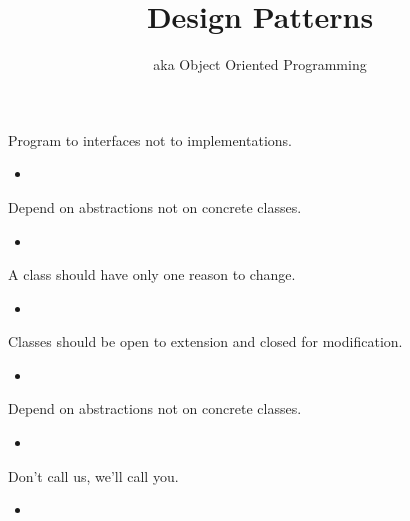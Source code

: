 \documentclass{beamer}
\title{Design Patterns}
\subtitle{aka Object Oriented Programming}
\begin{document}
\begin{frame}
  \titlepage
\end{frame}

\begin{frame}{Program to interfaces not to implementations.}
    \begin{itemize}
        \item
    \end{itemize}
\end{frame}

\begin{frame}{}
    
\end{frame}

\begin{frame}{Depend on abstractions not on concrete classes.}
    \begin{itemize}
        \item
    \end{itemize}
\end{frame}

\begin{frame}{}
    
\end{frame}

\begin{frame}{A class should have only one reason to change.}
    \begin{itemize}
        \item
    \end{itemize}
\end{frame}

\begin{frame}{Classes should be open to extension and closed for modification.}
    \begin{itemize}
        \item
    \end{itemize}
\end{frame}

\begin{frame}{Depend on abstractions not on concrete classes.}
    \begin{itemize}
        \item
    \end{itemize}
\end{frame}

\begin{frame}{Don't call us, we'll call you.}
    \begin{itemize}
        \item
    \end{itemize}
\end{frame}
\end{document}
